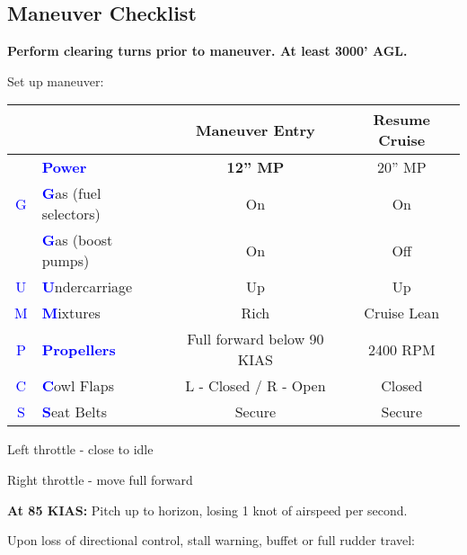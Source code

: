 \subsection{Maneuver Checklist}

\textbf{Perform clearing turns prior to maneuver. At least 3000' AGL.}

Set up maneuver:

\begin{table}[H]
\centering
\begin{tabular}{|c|l|c|c|}
\hline
                    &                                                 & \textbf{Maneuver Entry} & \textbf{Resume Cruise} \\ \hline
                    & \textcolor{blue}{\textbf{Power}}                & \textbf{12'' MP}        & 20'' MP                \\ \hline
\textcolor{blue}{G} & \textcolor{blue}{\textbf{G}}as (fuel selectors) & On                      & On                     \\
                    & \textcolor{blue}{\textbf{G}}as (boost pumps)    & On                      & Off                    \\ \hline
\textcolor{blue}{U} & \textcolor{blue}{\textbf{U}}ndercarriage        & Up                      & Up                     \\ \hline
\textcolor{blue}{M} & \textcolor{blue}{\textbf{M}}ixtures             & Rich                    & Cruise Lean            \\ \hline
\textcolor{blue}{P} & \textcolor{blue}{\textbf{Propellers}}           & Full forward below 90 KIAS & 2400 RPM            \\ \hline
\textcolor{blue}{C} & \textcolor{blue}{\textbf{C}}owl Flaps           & L - Closed / R - Open   & Closed                 \\ \hline
\textcolor{blue}{S} & \textcolor{blue}{\textbf{S}}eat Belts           & Secure                  & Secure                 \\ \hline
\end{tabular}
\end{table}

Left throttle - close to idle

Right throttle - move full forward

\textbf{At 85 KIAS:} Pitch up to horizon, losing 1 knot of airspeed per second.

Upon loss of directional control, stall warning, buffet or full rudder travel:

